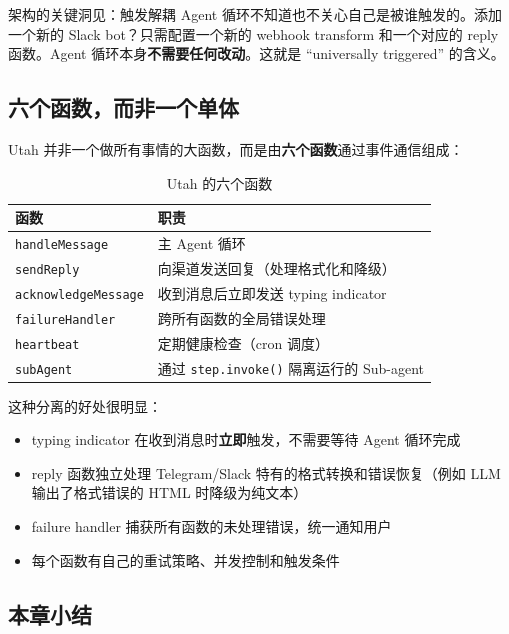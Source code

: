 \documentclass[a4paper]{article}
\begin{document}
\begin{importantbox}{架构的关键洞见：触发解耦}
Agent 循环不知道也不关心自己是被谁触发的。添加一个新的 Slack bot？只需配置一个新的 webhook transform 和一个对应的 reply 函数。Agent 循环本身\textbf{不需要任何改动}。这就是 ``universally triggered'' 的含义。
\end{importantbox}

\subsection{六个函数，而非一个单体}

Utah 并非一个做所有事情的大函数，而是由\textbf{六个函数}通过事件通信组成：

\begin{table}[H]
\centering
\caption{Utah 的六个函数}
\begin{tabular}{ll}
\toprule
\textbf{函数} & \textbf{职责} \\
\midrule
\texttt{handleMessage} & 主 Agent 循环 \\
\texttt{sendReply} & 向渠道发送回复（处理格式化和降级） \\
\texttt{acknowledgeMessage} & 收到消息后立即发送 typing indicator \\
\texttt{failureHandler} & 跨所有函数的全局错误处理 \\
\texttt{heartbeat} & 定期健康检查（cron 调度） \\
\texttt{subAgent} & 通过 \texttt{step.invoke()} 隔离运行的 Sub-agent \\
\bottomrule
\end{tabular}
\end{table}

这种分离的好处很明显：
\begin{itemize}
    \item typing indicator 在收到消息时\textbf{立即}触发，不需要等待 Agent 循环完成
    \item reply 函数独立处理 Telegram/Slack 特有的格式转换和错误恢复（例如 LLM 输出了格式错误的 HTML 时降级为纯文本）
    \item failure handler 捕获所有函数的未处理错误，统一通知用户
    \item 每个函数有自己的重试策略、并发控制和触发条件
\end{itemize}

\subsection{本章小结}
\end{document}
